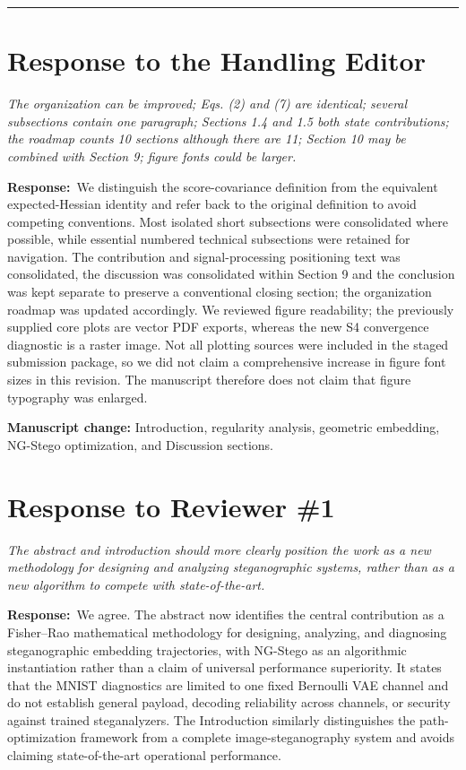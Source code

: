 \documentclass[12pt,a4paper]{article}
\newcommand{\revcomment}[1]{\par\medskip\noindent\colorbox{gray!15}{\parbox{\dimexpr\linewidth-2\fboxsep}{\itshape #1}}\par\medskip}
\newcommand{\ourresponse}{\noindent\textbf{Response:}\ }
\newcommand{\manuscriptchange}[1]{\par\smallskip\noindent\textcolor{blue!70!black}{\textbf{Manuscript change:} #1}\par\smallskip}
\begin{document}
\vspace{1em}\hrule\vspace{1em}

\section*{Response to the Handling Editor}

\revcomment{The organization can be improved; Eqs. (2) and (7) are identical; several subsections contain one paragraph; Sections 1.4 and 1.5 both state contributions; the roadmap counts 10 sections although there are 11; Section 10 may be combined with Section 9; figure fonts could be larger.}

\ourresponse We distinguish the score-covariance definition from the equivalent expected-Hessian identity and refer back to the original definition to avoid competing conventions. Most isolated short subsections were consolidated where possible, while essential numbered technical subsections were retained for navigation. The contribution and signal-processing positioning text was consolidated, the discussion was consolidated within Section 9 and the conclusion was kept separate to preserve a conventional closing section; the organization roadmap was updated accordingly. We reviewed figure readability; the previously supplied core plots are vector PDF exports, whereas the new S4 convergence diagnostic is a raster image. Not all plotting sources were included in the staged submission package, so we did not claim a comprehensive increase in figure font sizes in this revision. The manuscript therefore does not claim that figure typography was enlarged.

\manuscriptchange{Introduction, regularity analysis, geometric embedding, NG-Stego optimization, and Discussion sections.}

\section*{Response to Reviewer \#1}

\revcomment{The abstract and introduction should more clearly position the work as a new methodology for designing and analyzing steganographic systems, rather than as a new algorithm to compete with state-of-the-art.}

\ourresponse We agree. The abstract now identifies the central contribution as a Fisher--Rao mathematical methodology for designing, analyzing, and diagnosing steganographic embedding trajectories, with NG-Stego as an algorithmic instantiation rather than a claim of universal performance superiority. It states that the MNIST diagnostics are limited to one fixed Bernoulli VAE channel and do not establish general payload, decoding reliability across channels, or security against trained steganalyzers. The Introduction similarly distinguishes the path-optimization framework from a complete image-steganography system and avoids claiming state-of-the-art operational performance.
\end{document}
